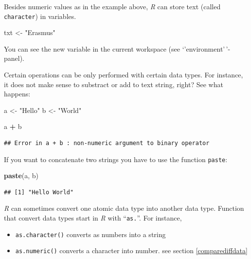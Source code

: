 \documentclass[
]{scrartcl}
\makeatletter
\newenvironment{Shaded}{\begin{snugshade}}{\end{snugshade}}
\newcommand{\FunctionTok}[1]{\textcolor[rgb]{0.13,0.29,0.53}{\textbf{#1}}}
\newcommand{\NormalTok}[1]{#1}
\newcommand{\OtherTok}[1]{\textcolor[rgb]{0.56,0.35,0.01}{#1}}
\newcommand{\SpecialCharTok}[1]{\textcolor[rgb]{0.81,0.36,0.00}{\textbf{#1}}}
\newcommand{\StringTok}[1]{\textcolor[rgb]{0.31,0.60,0.02}{#1}}
\providecommand{\tightlist}{%
  \setlength{\itemsep}{0pt}\setlength{\parskip}{0pt}}
\newenvironment{kframe}{%
\medskip{}
\setlength{\fboxsep}{.8em}
 \def\at@end@of@kframe{}%
 \ifinner\ifhmode%
  \def\at@end@of@kframe{\end{minipage}}%
  \begin{minipage}{\columnwidth}%
 \fi\fi%
 \def\FrameCommand##1{\hskip\@totalleftmargin \hskip-\fboxsep
 \colorbox{shadecolor}{##1}\hskip-\fboxsep
     \hskip-\linewidth \hskip-\@totalleftmargin \hskip\columnwidth}%
 \MakeFramed {\advance\hsize-\width
   \@totalleftmargin\z@ \linewidth\hsize
   \@setminipage}}%
 {\par\unskip\endMakeFramed%
 \at@end@of@kframe}
\newenvironment{rmdblock}[1]
  {
  \begin{itemize}
  \renewcommand{\labelitemi}{
    \raisebox{-.7\height}[0pt][0pt]{
      {\setkeys{Gin}{width=3em,keepaspectratio}\texttt{[image: images/\#1]}}
    }
  }
  \setlength{\fboxsep}{1em}
  \begin{kframe}
  \item
  }
  {
  \end{kframe}
  \end{itemize}
  }
\newenvironment{important}
    {\begin{rmdblock}{hint}}
    {\end{rmdblock}}
\makeatother
\begin{document}
Besides numeric values as in the example above, \emph{R} can store text (called \texttt{character}) in variables.

\begin{Shaded}
\begin{Highlighting}[]
\NormalTok{txt }\OtherTok{\textless{}{-}} \StringTok{"Erasmus"}
\end{Highlighting}
\end{Shaded}

You can see the new variable in the current workspace (see `'environment'\,'-panel).

Certain operations can be only performed with certain data types. For instance,
it does not make sense to substract or add to text string, right? See what happens:

\begin{Shaded}
\begin{Highlighting}[]
\NormalTok{a }\OtherTok{\textless{}{-}} \StringTok{"Hello"}
\NormalTok{b }\OtherTok{\textless{}{-}} \StringTok{"World"}
\end{Highlighting}
\end{Shaded}

\begin{Shaded}
\begin{Highlighting}[]
\NormalTok{a }\SpecialCharTok{+}\NormalTok{ b}
\end{Highlighting}
\end{Shaded}

\begin{verbatim}
## Error in a + b : non-numeric argument to binary operator
\end{verbatim}

If you want to concatenate two strings you have to use the function \texttt{paste}:

\begin{Shaded}
\begin{Highlighting}[]
\FunctionTok{paste}\NormalTok{(a, b)}
\end{Highlighting}
\end{Shaded}

\begin{verbatim}
## [1] "Hello World"
\end{verbatim}

\begin{important}
\emph{R} can sometimes convert one atomic data type into another data
type. Function that convert data types start in \emph{R} with
``\texttt{as.}''. For instance,

\begin{itemize}
\tightlist
\item
  \texttt{as.character()} converts as numbers into a string
\item
  \texttt{as.numeric()} converts a character into number. see section
  \ref{comparediffdata}
\end{itemize}
\end{important}
\end{document}
